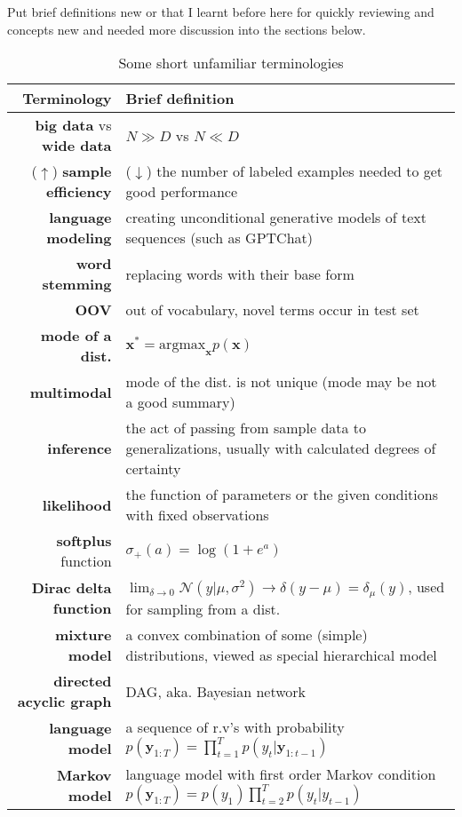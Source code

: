 \begin{table}[htpb]
    \centering
    \caption{Some short unfamiliar terminologies}
    {\footnotesize
    Put brief definitions new or that I learnt before here for quickly reviewing 
and concepts new and needed more discussion into the sections below.\\
}
    {\small
    \begin{tabular}{rp{32em}}
        \toprule
        Terminology & Brief definition \\
        \midrule
        \textbf{big data} vs \textbf{wide data} & $N\gg{D}$ vs $N\ll{D}$ \\
        ($\uparrow$) \textbf{sample efficiency} & ($\downarrow$) the number of labeled examples needed to get good performance \\
        \textbf{language modeling} & creating unconditional generative models of text sequences (such as GPTChat)\\
        \textbf{word stemming} & replacing words with their base form\\
        \textbf{OOV} & out of vocabulary, novel terms occur in test set\\
        \textbf{mode of a dist.} & $\bm{x}^*=\mathrm{argmax}_{\bm{x}}p(\bm{x})$ \\
        \textbf{multimodal} & mode of the dist. is not unique (mode may be not a good summary)\\
        \textbf{inference} & the act of passing from sample data to generalizations, usually with calculated degrees of certainty\\
        \textbf{likelihood} & the function of parameters or the given conditions with fixed observations\\
        \textbf{softplus} function & $\sigma_+(a)=\log{(1+e^a)}$\\
        \textbf{Dirac delta function} & $\lim_{\delta\to{0}}{\mathcal{N}(y|\mu,\sigma^2)}\to\delta(y-\mu)=\delta_\mu(y)$, used for sampling from a dist.\\
        \textbf{mixture model} & a convex combination of some (simple) distributions, viewed as special hierarchical model\\
        \textbf{directed acyclic graph} & DAG, aka. Bayesian network\\
        \textbf{language model} & a sequence of r.v's with probability $p(\bm{y}_{1:T})=\prod_{t=1}^T{p(y_t|\bm{y}_{1:t-1})}$\\
        \textbf{Markov model} & language model with first order Markov condition $p(\bm{y}_{1:T})=p(y_1)\prod_{t=2}^T{p(y_t|y_{t-1})}$\\

\end{tabular}}
\end{table}

